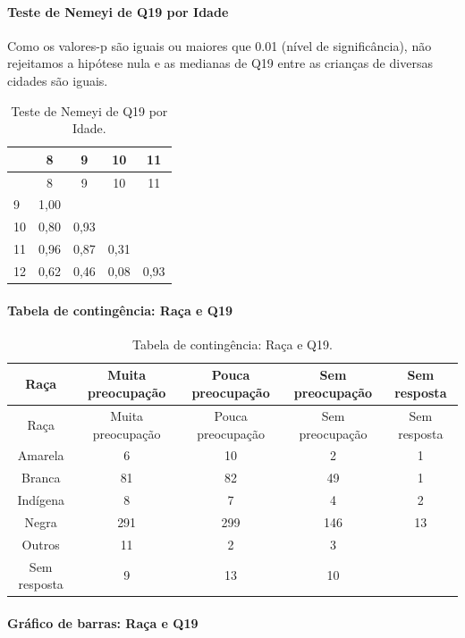 \documentclass[]{article}
\let\oldparagraph\paragraph
\renewcommand{\paragraph}[1]{\oldparagraph{#1}\mbox{}}
\begin{document}
\hypertarget{teste-de-nemeyi-de-q19-por-idade}{%
\paragraph{Teste de Nemeyi de Q19 por Idade}\label{teste-de-nemeyi-de-q19-por-idade}}

Como os valores-p são iguais ou maiores que 0.01 (nível de significância), não rejeitamos a hipótese nula e as medianas de Q19 entre as crianças de diversas cidades são iguais.

\begin{longtable}[]{@{}lcccc@{}}
\caption{\label{tab:unnamed-chunk-336}Teste de Nemeyi de Q19 por Idade.}\tabularnewline
\toprule
& 8 & 9 & 10 & 11\tabularnewline
\midrule
\endfirsthead
\toprule
& 8 & 9 & 10 & 11\tabularnewline
\midrule
\endhead
9 & 1,00 & & &\tabularnewline
10 & 0,80 & 0,93 & &\tabularnewline
11 & 0,96 & 0,87 & 0,31 &\tabularnewline
12 & 0,62 & 0,46 & 0,08 & 0,93\tabularnewline
\bottomrule
\end{longtable}

\cleardoublepage

\hypertarget{tabela-de-continguxeancia-rauxe7a-e-q19}{%
\paragraph{Tabela de contingência: Raça e Q19}\label{tabela-de-continguxeancia-rauxe7a-e-q19}}

\begin{longtable}[]{@{}ccccc@{}}
\caption{\label{tab:unnamed-chunk-337}Tabela de contingência: Raça e Q19.}\tabularnewline
\toprule
Raça & Muita preocupação & Pouca preocupação & Sem preocupação & Sem resposta\tabularnewline
\midrule
\endfirsthead
\toprule
Raça & Muita preocupação & Pouca preocupação & Sem preocupação & Sem resposta\tabularnewline
\midrule
\endhead
Amarela & 6 & 10 & 2 & 1\tabularnewline
Branca & 81 & 82 & 49 & 1\tabularnewline
Indígena & 8 & 7 & 4 & 2\tabularnewline
Negra & 291 & 299 & 146 & 13\tabularnewline
Outros & 11 & 2 & 3 &\tabularnewline
Sem resposta & 9 & 13 & 10 &\tabularnewline
\bottomrule
\end{longtable}

\hypertarget{gruxe1fico-de-barras-rauxe7a-e-q19}{%
\paragraph{Gráfico de barras: Raça e Q19}\label{gruxe1fico-de-barras-rauxe7a-e-q19}}
\end{document}

